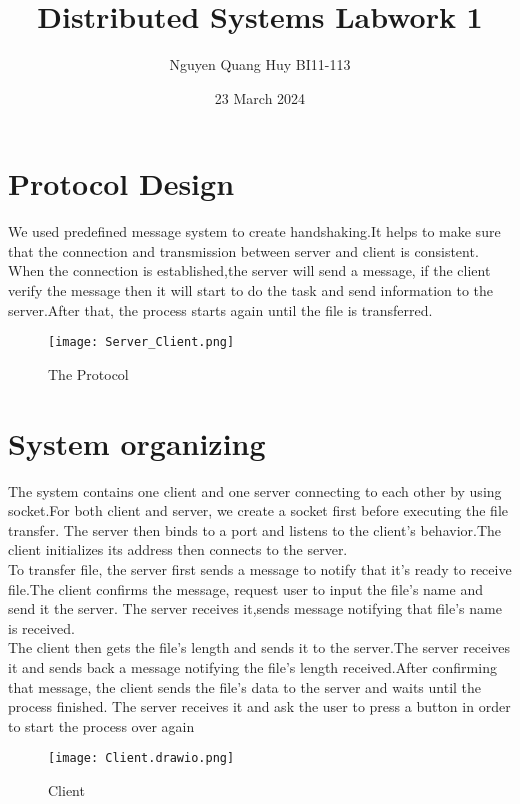 \documentclass{article}
\title{Distributed Systems Labwork 1}
\author{Nguyen Quang Huy BI11-113}
\date{23 March 2024}
\begin{document}
\maketitle

\vspace{16cm}

\section{Protocol Design}
We used predefined message system to create handshaking.It helps to make sure that the connection and transmission between server and client is consistent. 
\\When the connection is established,the server will send a message, if the client verify the message then it will start to do the task and send information to the server.After that, the process starts again until the file is transferred.

\begin{figure}[H]
\centering
\texttt{[image: Server\_Client.png]}
\caption{The Protocol}
\label{fig:figure1}
\end{figure}

\section{System organizing}
The system contains one client and one server connecting to each other by using socket.For both client and server, we create a socket first before executing the file transfer. The server then binds to a port and listens to the client's behavior.The client initializes its address then connects to the server.
\\
To transfer file, the server first sends a message to notify that it's ready to receive file.The client confirms the message, request user to input the file's name and send it the server. The server receives it,sends message notifying that file's name is received. 
\\The client then gets the file's length and sends it to the server.The server receives it and sends back a message notifying the file's length received.After confirming that message, the client sends the file's data to the server and waits until the process finished. The server receives it and ask the user to press a button in order to start the process over again
\begin{figure}[H]
    \centering
    \texttt{[image: Client.drawio.png]}
    \caption{Client}
    \label{fig:figure2}
\end{figure}
\end{document}
